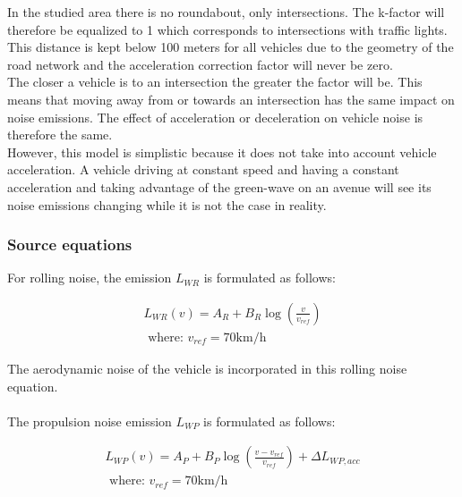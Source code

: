 \documentclass{article}
\begin{document}
{\color{red}
In the studied area there is no roundabout, only intersections. The k-factor will therefore be equalized to 1 which corresponds to intersections with traffic lights. \\
This distance is kept below 100 meters for all vehicles due to the geometry of the road network and the acceleration correction factor will never be zero. \\
The closer a vehicle is to an intersection the greater the factor will be. This means that moving away from or towards an intersection has the same impact on noise emissions. The effect of acceleration or deceleration on vehicle noise is therefore the same. \\
However, this model is simplistic because it does not take into account vehicle acceleration. A vehicle driving at constant speed and having a constant acceleration and taking advantage of the green-wave on an avenue will see its noise emissions changing while it is not the case in reality.}

\subsubsection{Source equations}

\noindent For rolling noise, the emission $L_{WR}$ is formulated as follows:

\begin{equation}
    \label{RNC_IMAGINE}
    \begin{aligned}
        L_{WR}(v) = A_R+B_R\log(\frac{v}{v_{ref}}) \\
        \text{ where: } v_{ref}=70 \text{km/h}
    \end{aligned}
\end{equation}

\noindent The aerodynamic noise of the vehicle is incorporated in this rolling noise equation.\\
\\

\noindent The propulsion noise emission $L_{WP}$ is formulated as follows:


\begin{equation}
    \label{RNC_IMAGINE}
    \begin{aligned}
        L_{WP}(v) = A_P+B_P\log(\frac{v-v_{ref}}{v_{ref}})+ \Delta L_{WP,acc} \\
        \text{ where: } v_{ref}=70 \text{km/h}
    \end{aligned}
\end{equation}
\end{document}
